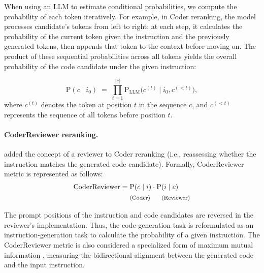 When using an LLM to estimate conditional probabilities, we compute the probability of each token iteratively. For example, in Coder reranking, the model processes candidate's tokens from left to right: at each step, it calculates the probability of the current token given the instruction and the previously generated tokens, then appends that token to the context before moving on. The product of these sequential probabilities across all tokens yields the overall probability of the code candidate under the given instruction:

\[
\text{P}(c \mid i_0) \;=\; \prod_{t=1}^{|c|} \text{P}_{\text{LLM}}\bigl(c^{(t)} \mid i_0, c^{(<t)}\bigr),
\]
where $c^{(t)}$ denotes the token at position $t$ in the sequence $c$, and $c^{(<t)}$ represents the sequence of all tokens before position $t$.

\paragraph{CoderReviewer reranking.} \citet{zhang2022coderreviewerrerankingcode} added the concept of a reviewer to Coder reranking (i.e.,  reassessing whether the instruction matches the generated code candidate). Formally, CoderReviewer metric is represented as follows: 
\[
\begin{aligned}
\text{CoderReviewer} &=  \text{P}(c \mid i) \cdot \text{P}(i \mid c) \\
&\quad \text{ \footnotesize (Coder) \hspace{1.2em} (Reviewer)}
\end{aligned}
\]

The prompt positions of the instruction and code candidates are reversed in the reviewer's implementation. Thus, the code-generation task is reformulated as an instruction-generation task to calculate the probability of a given instruction. The CoderReviewer metric is also considered a specialized form of maximum mutual information \citep{li2016mutualinformationdiversedecoding}, measuring the bidirectional alignment between the generated code and the input instruction.

